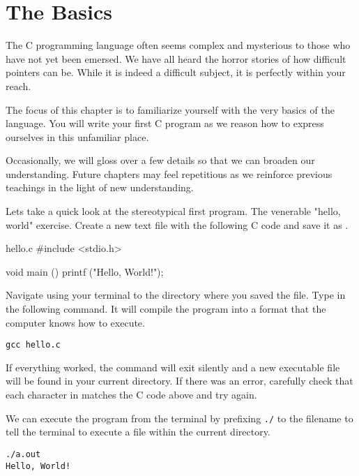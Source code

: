 \chapter{The Basics}

The C programming language often seems complex and mysterious to those who have
not yet been emersed. We have all heard the horror stories of how difficult
pointers can be. While it is indeed a difficult subject, it is perfectly within
your reach.

The focus of this chapter is to familiarize yourself with the very basics of
the language. You will write your first C program as we reason how to express
ourselves in this unfamiliar place.

Occasionally, we will gloss over a few details so that we can broaden our
understanding. Future chapters may feel repetitious as we reinforce previous
teachings in the light of new understanding.

Lets take a quick look at the stereotypical first program. The venerable
"hello, world" exercise. Create a new text file with the following C code and
save it as .

\begin{code}{hello.c}
#include <stdio.h>

void main ()
{
    printf ("Hello, World!\n");
}
\end{code}

Navigate using your terminal to the directory where you saved the file. Type in
the following command. It will compile the program into a format that the
computer knows how to execute.

\begin{Terminal}
\begin{Verbatim}
gcc hello.c
\end{Verbatim}
\end{Terminal}

If everything worked, the  command will exit silently and a new
executable file  will be found in your current directory. If there
was an error, carefully check that each character in  matches the
C code above and try again.

We can execute the program from the terminal by prefixing \verb|./| to the
filename to tell the terminal to execute a file within the current directory.

\begin{Terminal}
\begin{Verbatim}
./a.out
Hello, World!
\end{Verbatim}
\end{Terminal}

